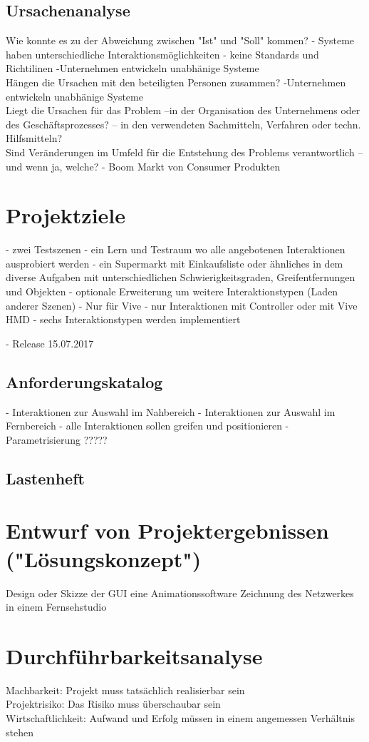 \documentclass[a4paper, 12pt]{article}
\begin{document}
\subsection{Ursachenanalyse}
Wie konnte es zu der Abweichung zwischen "Ist" und "Soll" kommen? 
- Systeme haben unterschiedliche Interaktionsmöglichkeiten
- keine Standards und Richtilinen
-Unternehmen entwickeln unabhänige Systeme
\\
Hängen die Ursachen mit den beteiligten Personen zusammen? 
-Unternehmen entwickeln unabhänige Systeme
\\
Liegt die Ursachen für das Problem –in der Organisation des Unternehmens oder des Geschäftsprozesses? – in den verwendeten Sachmitteln, Verfahren oder techn. Hilfsmitteln?
\\
Sind Veränderungen im Umfeld für die Entstehung des Problems verantwortlich – und wenn ja, welche? 
- Boom Markt von Consumer Produkten
\section{Projektziele}
- zwei Testszenen
- ein Lern und Testraum wo alle angebotenen Interaktionen ausprobiert werden
- ein Supermarkt mit Einkaufsliste oder ähnliches in dem diverse Aufgaben mit unterschiedlichen Schwierigkeitsgraden, Greifentfernungen und Objekten
- optionale Erweiterung um weitere Interaktionstypen (Laden anderer Szenen)
- Nur für Vive
- nur Interaktionen mit Controller oder mit Vive HMD
- sechs Interaktionstypen werden implementiert

- Release 15.07.2017

\subsection{Anforderungskatalog}
- Interaktionen zur Auswahl im Nahbereich
- Interaktionen zur Auswahl im Fernbereich
- alle Interaktionen sollen greifen und positionieren
- Parametrisierung ?????

\subsection{Lastenheft}
\section{Entwurf von Projektergebnissen ("Lösungskonzept") }
Design oder Skizze der GUI eine Animationssoftware
Zeichnung des Netzwerkes in einem Fernsehstudio 
\section{Durchführbarkeitsanalyse}
Machbarkeit: Projekt muss tatsächlich realisierbar sein 
\\
Projektrisiko: Das Risiko muss überschaubar sein 
\\
Wirtschaftlichkeit: Aufwand und Erfolg müssen in einem angemessen Verhältnis stehen 
\end{document}
